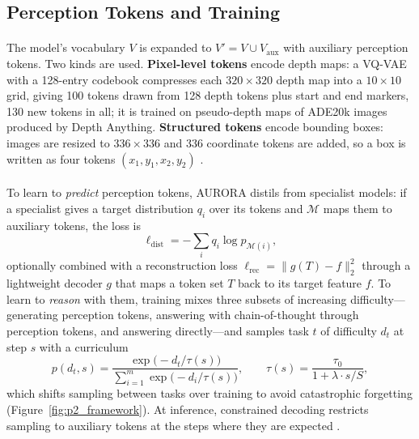\documentclass[12pt,a4paper,final]{extreport}
\begin{document}
\subsection{Perception Tokens and Training}

\paragraph{} The model's vocabulary $V$ is expanded to $V'=V\cup V_{\mathrm{aux}}$ with auxiliary perception tokens. Two kinds are used. \textbf{Pixel-level tokens} encode depth maps: a VQ-VAE \cite{oord2017} with a 128-entry codebook compresses each $320\times320$ depth map into a $10\times10$ grid, giving 100 tokens drawn from 128 depth tokens plus start and end markers, 130 new tokens in all; it is trained on pseudo-depth maps of ADE20k images produced by Depth Anything. \textbf{Structured tokens} encode bounding boxes: images are resized to $336\times336$ and 336 coordinate tokens are added, so a box is written as four tokens $(x_1,y_1,x_2,y_2)$ \cite{p2}.

\paragraph{} To learn to \emph{predict} perception tokens, AURORA distils from specialist models: if a specialist gives a target distribution $q_i$ over its tokens and $\mathcal{M}$ maps them to auxiliary tokens, the loss is
\begin{equation}
\ell_{\mathrm{dist}}=-\sum_{i}q_i\log p_{\mathcal{M}(i)},
\end{equation}
optionally combined with a reconstruction loss $\ell_{\mathrm{rec}}=\|g(T)-f\|_2^2$ through a lightweight decoder $g$ that maps a token set $T$ back to its target feature $f$. To learn to \emph{reason} with them, training mixes three subsets of increasing difficulty---generating perception tokens, answering with chain-of-thought through perception tokens, and answering directly---and samples task $t$ of difficulty $d_t$ at step $s$ with a curriculum
\begin{equation}
p(d_t,s)=\frac{\exp\big(-d_t/\tau(s)\big)}{\sum_{i=1}^{m}\exp\big(-d_i/\tau(s)\big)},\qquad \tau(s)=\frac{\tau_0}{1+\lambda\cdot s/S},
\end{equation}
which shifts sampling between tasks over training to avoid catastrophic forgetting (Figure~\ref{fig:p2_framework}). At inference, constrained decoding restricts sampling to auxiliary tokens at the steps where they are expected \cite{p2}.
\end{document}
